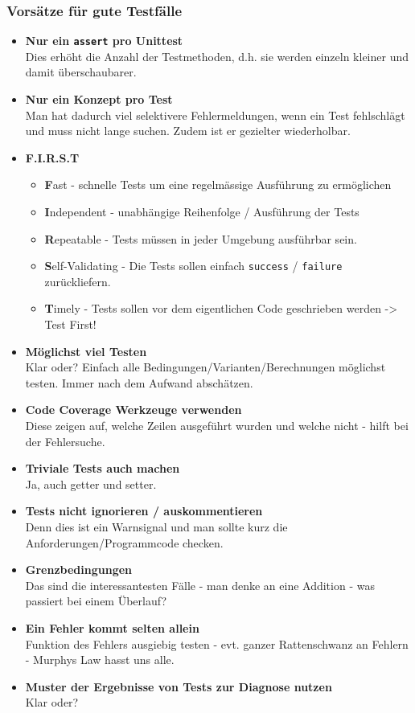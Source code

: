 \subsubsection{Vorsätze für gute Testfälle}
\begin{itemize}
  \item \textbf{Nur ein \texttt{assert} pro Unittest} \\
  Dies erhöht die Anzahl der Testmethoden, d.h. sie werden einzeln kleiner und damit überschaubarer. 
  \item \textbf{Nur ein Konzept pro Test} \\
  Man hat dadurch viel selektivere Fehlermeldungen, wenn ein Test fehlschlägt und muss nicht lange suchen. Zudem ist er gezielter wiederholbar.
  \item \textbf{F.I.R.S.T}
  \begin{itemize}
      \item \textbf{F}ast - schnelle Tests um eine regelmässige Ausführung zu ermöglichen
      \item \textbf{I}ndependent - unabhängige Reihenfolge / Ausführung der Tests
      \item \textbf{R}epeatable - Tests müssen in jeder Umgebung ausführbar sein.
      \item \textbf{S}elf-Validating - Die Tests sollen einfach \texttt{success} / \texttt{failure} zurückliefern.
      \item \textbf{T}imely - Tests sollen vor dem eigentlichen Code geschrieben werden -> Test First!
  \end{itemize}
  \item \textbf{Möglichst viel Testen} \\
  Klar oder? Einfach alle Bedingungen/Varianten/Berechnungen möglichst testen. Immer nach dem Aufwand abschätzen.
  \item \textbf{Code Coverage Werkzeuge verwenden} \\
  Diese zeigen auf, welche Zeilen ausgeführt wurden und welche nicht - hilft bei der Fehlersuche.
  \item \textbf{Triviale Tests auch machen} \\
  Ja, auch getter und setter.
  \item \textbf{Tests nicht ignorieren / auskommentieren} \\
  Denn dies ist ein Warnsignal und man sollte kurz die Anforderungen/Programmcode checken.
  \item \textbf{Grenzbedingungen} \\
  Das sind die interessantesten Fälle - man denke an eine Addition - was passiert bei einem Überlauf?
  \item \textbf{Ein Fehler kommt selten allein} \\
  Funktion des Fehlers ausgiebig testen - evt. ganzer Rattenschwanz an Fehlern - Murphys Law hasst uns alle.
  \item \textbf{Muster der Ergebnisse von Tests zur Diagnose nutzen} \\
  Klar oder?
\end{itemize}


